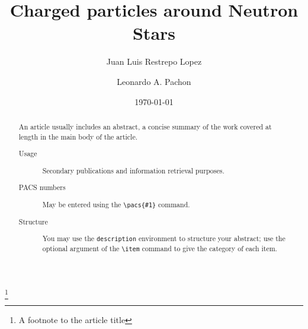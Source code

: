 \documentclass[%
 reprint,
 amsmath,amssymb,
 aps,
]{revtex4-1}
\begin{document}

\title{Charged particles around Neutron Stars}%
\thanks{A footnote to the article title}%

\author{Juan Luis Restrepo Lopez}
\author{Leonardo A. Pachon}%
%


\date{\today}%

\begin{abstract}
An article usually includes an abstract, a concise summary of the work
covered at length in the main body of the article. 
\begin{description}
\item[Usage]
Secondary publications and information retrieval purposes.
\item[PACS numbers]
May be entered using the \verb+\pacs{#1}+ command.
\item[Structure]
You may use the \texttt{description} environment to structure your abstract;
use the optional argument of the \verb+\item+ command to give the category of each item. 
\end{description}
\end{abstract}

\maketitle

\end{document}
